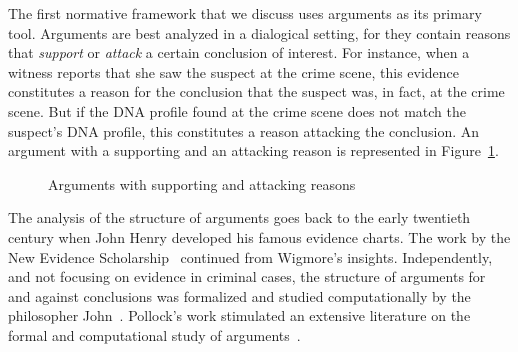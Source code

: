 \documentclass[10pt]{article}
\begin{document}
The first normative framework %
that we discuss uses arguments as its primary tool. 
Arguments are best analyzed in a dialogical setting, for they 
contain reasons that \textit{support} or \textit{attack} a certain conclusion of interest. For instance, when a witness reports that 
she saw the suspect at the crime scene, this evidence constitutes a reason for the conclusion that 
the suspect was, in fact, at the crime scene. But if the DNA profile found at the crime scene 
does not match the suspect's DNA profile, this constitutes 
a reason attacking the conclusion. An argument with a supporting and 
an attacking reason is represented in Figure~\ref{fig:arg}.

\begin{figure}[bt]
\centering

\caption{Arguments with supporting and attacking reasons\label{fig:arg}}
\end{figure}


The analysis of the structure of arguments goes back to the early twentieth century when John Henry \cite{wigmore1913} developed his famous evidence charts. The work by the New Evidence Scholarship~\citep{andersonEtal2005} continued from Wigmore's insights. Independently, and not focusing on evidence in criminal cases, the structure of arguments for and against conclusions was formalized and studied  computationally by the philosopher John~\citet{pollock1987,pollock1995}. Pollock's work stimulated an extensive literature on the formal and computational study of arguments~\citep{vanEemerenEtal2014ch11}.
\end{document}
